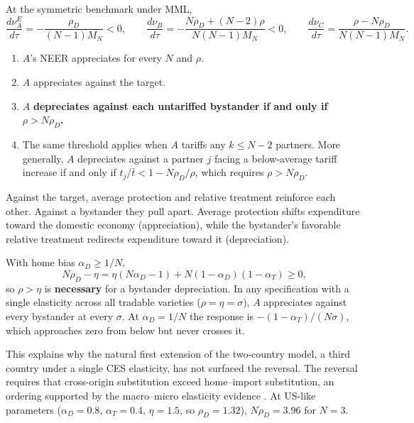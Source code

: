 \begin{proposition}
\label{prop:unilateral}
At the symmetric benchmark under MML,
\begin{equation}
\frac{d\nu^E_A}{d\tau}=-\frac{\rho_D}{(N-1)M_N}<0,\qquad
\frac{d\nu_B}{d\tau}=-\frac{N\rho_D+(N-2)\rho}{N(N-1)M_N}<0,\qquad
\frac{d\nu_C}{d\tau}=\frac{\rho-N\rho_D}{N(N-1)M_N}.
\label{eq:unilateral}
\end{equation}
\begin{enumerate}[label=(\roman*)]
\item $A$'s NEER appreciates for every $N$ and $\rho$.
\item $A$ appreciates against the target.
\item $A$ \textbf{depreciates against each untariffed bystander if and only if $\rho>N\rho_D$.}
\item The same threshold applies when $A$ tariffs any $k\leq N-2$ partners. More generally, $A$ depreciates against a partner $j$ facing a below-average tariff increase if and only if $t_j/\bar t<1-N\rho_D/\rho$, which requires $\rho>N\rho_D$.
\end{enumerate}
\end{proposition}

Against the target, average protection and relative treatment reinforce each other. Against a bystander they pull apart. Average protection shifts expenditure toward the domestic economy (appreciation), while the bystander's favorable relative treatment redirects expenditure toward it (depreciation).

\begin{corollary}
\label{cor:single}
With home bias $\alpha_D\geq1/N$,
\begin{equation}
N\rho_D-\eta=\eta(N\alpha_D-1)+N(1-\alpha_D)(1-\alpha_T)\geq0,
\label{eq:single}
\end{equation}
so $\rho>\eta$ is \textbf{necessary} for a bystander depreciation. In any specification with a single elasticity across all tradable varieties ($\rho=\eta=\sigma$), $A$ appreciates against every bystander at every $\sigma$. At $\alpha_D=1/N$ the response is $-(1-\alpha_T)/(N\sigma)$, which approaches zero from below but never crosses it.
\end{corollary}

This explains why the natural first extension of the two-country model, a third country under a single CES elasticity, has not surfaced the reversal. The reversal requires that cross-origin substitution exceed home--import substitution, an ordering supported by the macro--micro elasticity evidence \citep{feenstra2018,li2022}. At US-like parameters ($\alpha_D=0.8$, $\alpha_T=0.4$, $\eta=1.5$, so $\rho_D=1.32$), $N\rho_D=3.96$ for $N=3$.

